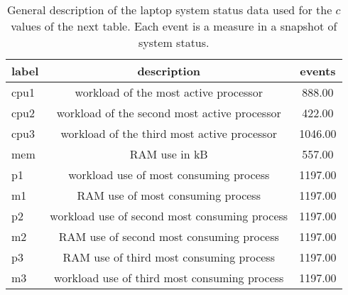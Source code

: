 \begin{table}[h!]
\begin{center}
\begin{tabular}{| l | c | c |}\hline
label & description & events \\\hline
cpu1 & workload of the most active processor  & 888.00 \\\hline
cpu2 & workload of the second most active processor  & 422.00 \\\hline
cpu3 & workload of the third most active processor  & 1046.00 \\\hline
mem & RAM use in kB  & 557.00 \\\hline
p1 & workload use of most consuming process  & 1197.00 \\\hline
m1 & RAM use of most consuming process  & 1197.00 \\\hline
p2 & workload use of second most consuming process  & 1197.00 \\\hline
m2 & RAM use of second most consuming process  & 1197.00 \\\hline
p3 & RAM use of third most consuming process  & 1197.00 \\\hline
m3 & workload use of third most consuming process  & 1197.00 \\\hline
\end{tabular}
\caption{General description of the laptop system status data used for the $c$ values of the next table. Each event is a measure in a snapshot of system status.}
\end{center}
\end{table}